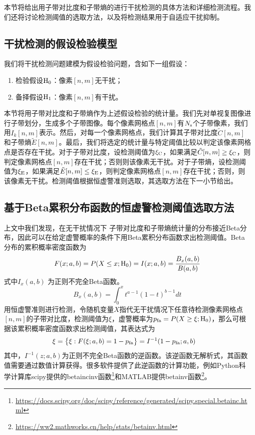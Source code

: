 \documentclass[10.5pt,UTF8]{JR}
\theoremstyle{mystyle}
\begin{document}
本节将给出用子带对比度和子带熵的进行干扰检测的具体方法和详细检测流程。我们还将讨论检测阈值的选取方法，以及将检测结果用于自适应干扰抑制。

\subsection{干扰检测的假设检验模型}

我们将干扰检测问题建模为假设检验问题，含如下一组假设：
\begin{enumerate}
\setlength{\itemsep}{0pt}
\setlength{\parsep}{0pt}
  \item 检验假设${\rm H}_0$：像素$[n,m]$无干扰；
  \item 备择假设${\rm H}_1$：像素$[n,m]$有干扰。
\end{enumerate}
本节将用子带对比度和子带熵作为上述假设检验的统计量。我们先对单视复图像进行子带划分，生成多个子带图像。每个像素网格点$[n,m]$有$N_{\rm s}$个子带像素，我们用$I_k[n,m]$表示。然后，对每一个像素网格点，我们计算其子带对比度$\tilde{C}[n,m]$和子带熵$\tilde{E}[n,m]$。最后，我们将选定的统计量与特定阈值比较以判定该像素网格点是否存在干扰。对于子带对比度，设检测阈值为$\xi_{\rm C}$，如果满足$\tilde{C}[n,m]\ge\xi_{\rm C}$，则判定像素网格点$[n,m]$存在干扰；否则则该像素无干扰。对于子带熵，设检测阈值为$\xi_{\rm E}$，如果满足$\tilde{E}[n,m]\le\xi_{\rm E}$，则判定像素网格点$[n,m]$存在干扰；否则，则该像素无干扰。检测阈值根据恒虚警准则选取，其选取方法在下一小节给出。

\subsection{基于Beta累积分布函数的恒虚警检测阈值选取方法}

上文中我们发现，在无干扰情况下 子带对比度和子带熵统计量的分布接近Beta分布，因此可以在给定虚警概率的条件下用Beta累积分布函数求出检测阈值。Beta分布的累积概率密度函数为
\begin{equation}
  F(x;a,b) = P(X \le x ; {\rm H}_0) = I(x;a,b)=\frac{B_x(a,b)}{B(a,b)}
\end{equation}
式中$I_x(a,b)$ 为正则不完全Beta函数。
\begin{equation}
    B_x(a,b)=\int_0^xt^{a-1}(1-t)^{b-1}dt
\end{equation}
用恒虚警准则进行检测，令随机变量$X$指代无干扰情况下任意待检测像素网格点$[n,m]$的子带对比度，检测阈值为$\xi$，虚警概率为$p_{\rm fa} =P(X\ge \xi ; {\rm H}_0)$，那么可根据该累积概率密度函数求出检测阈值，其表达式为
\begin{equation}
\begin{split}
    \xi&=\big\{\xi:F(\xi;a,b)=1-p_{\rm fa}\big\} = I^{-1}(1-p_{\rm fa} ; a,b)
\end{split}
\end{equation}
其中，$I^{-1}(z;a,b)$为正则不完全Beta函数的逆函数。该逆函数无解析式，其函数值需要通过数值计算获得。很多软件提供了此逆函数的计算功能，例如Python科学计算库scipy提供的betaincinv函数\footnote{\noindent\url{https://docs.scipy.org/doc/scipy/reference/generated/scipy.special.betainc.html}}和MATLAB提供betainv函数\footnote{\noindent\url{https://ww2.mathworks.cn/help/stats/betainv.html}}。
\end{document}
